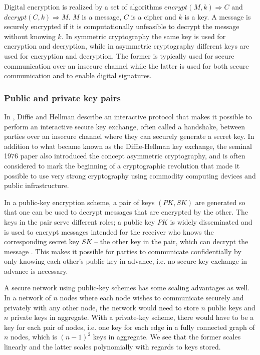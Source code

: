 Digital encryption is realized by a set of algorithms $encrypt(M, k) \Rightarrow C$ and $decrypt(C, k) \Rightarrow M$. $M$ is a message, $C$ is a cipher and $k$ is a key. A message is securely encrypted if it is computationally unfeasible to decrypt the message without knowing $k$. In symmetric cryptography the same key is used for encryption and decryption, while in asymmetric cryptography different keys are used for encryption and decryption. The former is typically used for secure communication over an insecure channel while the latter is used for both secure communication and to enable digital signatures.

\subsubsection{Public and private key pairs}

In \cite{diffie1976new}, Diffie and Hellman describe an interactive protocol that makes it possible to perform an interactive secure key exchange, often called a handshake, between parties over an insecure channel where they can securely generate a secret key. In addition to what became known as the Diffie-Hellman key exchange, the seminal 1976 paper also introduced the concept asymmetric cryptography, and is often considered to mark the beginning of a cryptographic revolution that made it possible to use very strong cryptography using commodity computing devices and public infrastructure. 

In a public-key encryption scheme, a pair of keys $(PK, SK)$ are generated so that one can be used to decrypt messages that are encrypted by the other. The keys in the pair serve different roles; a public key $PK$ is widely disseminated and is used to encrypt messages intended for the receiver who knows the corresponding secret key $SK$ – the other key in the pair, which can decrypt the message \cite[p.~370]{lindell2014introduction}. This makes it possible for parties to communicate confidentially by only knowing each other's public key in advance, i.e. no secure key exchange in advance is necessary. 

A secure network using public-key schemes has some scaling advantages as well. In a network of $n$ nodes where each node wishes to communicate securely and privately with any other node, the network would need to store $n$ public keys and $n$ private keys in aggregate. With a private-key scheme, there would have to be a key for each pair of nodes, i.e. one key for each edge in a fully connected graph of $n$ nodes, which is $(n-1)^2$ keys in aggregate. We see that the former scales linearly and the latter scales polynomially with regards to keys stored. 

